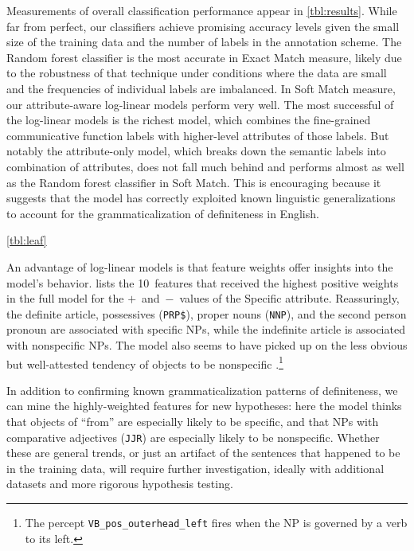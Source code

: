 \documentclass[11pt,letterpaper]{article}
\begin{document}
Measurements of overall classification performance appear in \cref{tbl:results}. While far from perfect, our classifiers achieve promising accuracy levels 
given the small size of the training data and the number of labels in the annotation scheme.
The Random forest classifier is the most accurate in Exact Match measure, likely due to the robustness of that technique under
conditions where the data are small and the frequencies of individual labels are imbalanced. In Soft Match measure, our attribute-aware log-linear models perform very well. The most successful of the log-linear models is the richest model, which combines the fine-grained 
communicative function labels with higher-level attributes of those labels. But notably the attribute-only model,
which breaks down the semantic labels into combination of attributes, does not fall much behind and performs almost as well as the Random forest classifier in Soft Match.
This is encouraging because it suggests that the model has correctly exploited known linguistic generalizations 
to account for the grammaticalization of definiteness in English. 

\cref{tbl:leaf}

An advantage of log-linear models is that feature weights offer insights into the model's behavior.
 lists the 10~features that received the highest positive weights in the full model 
for the \mbox{$+$ and $-$ values} of the Specific attribute. Reassuringly, the definite article, 
possessives (\texttt{PRP\$}), proper nouns (\texttt{NNP}), and the second person pronoun 
are associated with specific NPs, while the indefinite article is associated with nonspecific NPs.
The model also seems to have picked up on the less obvious but well-attested tendency 
of objects to be nonspecific \citep{aissen-03}.\footnote{The percept \texttt{VB\_pos\_outerhead\_left} 
fires when the NP is governed by a verb to its left.}

In addition to confirming known grammaticalization patterns of definiteness, 
we can mine the highly-weighted features for new hypotheses: 
here the model thinks that objects of ``from'' are especially likely to be specific, 
and that NPs with comparative adjectives (\texttt{JJR}) are especially likely to be nonspecific.
Whether these are general trends, or just an artifact of the sentences that happened to be in the training data, 
will require further investigation, ideally with additional datasets and more rigorous hypothesis testing.
\end{document}
